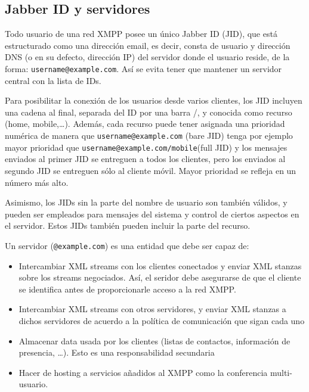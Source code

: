 \documentclass[a4paper, 11pt]{article} %
\begin{document}
  
  \subsection{Jabber ID y servidores}
    Todo usuario de una red XMPP posee un único Jabber ID (JID), que está estructurado como una dirección email, es decir, 
    consta de usuario y dirección DNS (o en su defecto, dirección IP) del servidor donde el usuario reside, de la forma:
    \texttt{username@example.com}. Así se evita tener que mantener un servidor central con la lista de IDs.
    
    Para posibilitar la conexión de los usuarios desde varios clientes, los JID incluyen una cadena al final, separada
    del ID por una barra /, y conocida como recurso (home, mobile,\ldots). Además, cada recurso puede
    tener asignada una prioridad numérica de manera que \texttt{username@example.com} (bare JID) tenga por ejemplo mayor prioridad que 
    \texttt{username@example.com/mobile}(full JID) y los mensajes enviados al primer JID se entreguen a todos los clientes,
    pero los enviados al segundo JID se entreguen sólo al cliente móvil. Mayor prioridad se refleja en un número más alto.
    
    Asimismo, los JIDs sin la parte del nombre de usuario son también válidos, y pueden ser empleados para mensajes del
    sistema y control de ciertos aspectos en el servidor. Estos JIDs también pueden incluir la parte del recurso.
    
    Un servidor (\texttt{@example.com}) es una entidad que debe ser capaz de:
    \begin{itemize}
     \item Intercambiar XML streams con los clientes conectados y enviar XML stanzas sobre los streams negociados. Así, el
     seridor debe asegurarse de que el cliente se identifica antes de proporcionarle acceso a la red XMPP.
     \item Intercambiar XML streams con otros servidores, y enviar XML stanzas a dichos servidores de acuerdo a la política
     de comunicación que sigan cada uno
     \item Almacenar data usada por los clientes (listas de contactos, información de presencia, \ldots). Esto es una
     responsabilidad secundaria
     \item Hacer de hosting a servicios añadidos al XMPP como la conferencia multi-usuario.
    \end{itemize}
    
\end{document}
